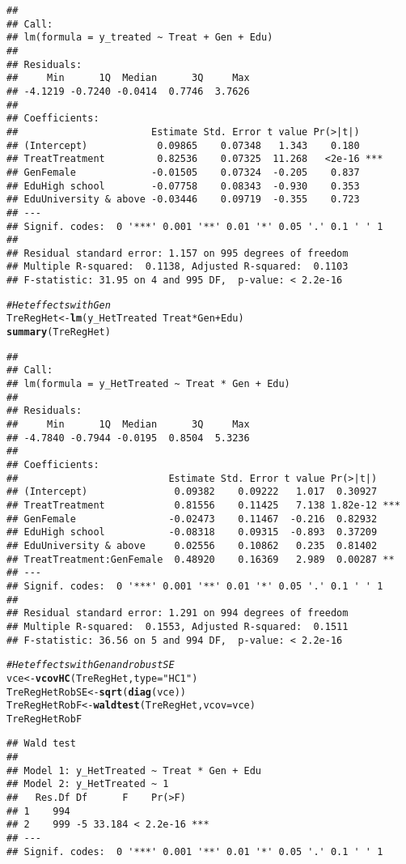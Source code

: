 \documentclass[11pt, a4paper]{article}\usepackage[]{graphicx}\usepackage[]{color}
\makeatletter
\newcommand{\hlstr}[1]{\textcolor[rgb]{0.192,0.494,0.8}{#1}}%
\newcommand{\hlcom}[1]{\textcolor[rgb]{0.678,0.584,0.686}{\textit{#1}}}%
\newcommand{\hlopt}[1]{\textcolor[rgb]{0,0,0}{#1}}%
\newcommand{\hlstd}[1]{\textcolor[rgb]{0.345,0.345,0.345}{#1}}%
\newcommand{\hlkwb}[1]{\textcolor[rgb]{0.69,0.353,0.396}{#1}}%
\newcommand{\hlkwc}[1]{\textcolor[rgb]{0.333,0.667,0.333}{#1}}%
\newcommand{\hlkwd}[1]{\textcolor[rgb]{0.737,0.353,0.396}{\textbf{#1}}}%
\newenvironment{kframe}{%
 \def\at@end@of@kframe{}%
 \ifinner\ifhmode%
  \def\at@end@of@kframe{\end{minipage}}%
  \begin{minipage}{\columnwidth}%
 \fi\fi%
 \def\FrameCommand##1{\hskip\@totalleftmargin \hskip-\fboxsep
 \colorbox{shadecolor}{##1}\hskip-\fboxsep
     \hskip-\linewidth \hskip-\@totalleftmargin \hskip\columnwidth}%
 \MakeFramed {\advance\hsize-\width
   \@totalleftmargin\z@ \linewidth\hsize
   \@setminipage}}%
 {\par\unskip\endMakeFramed%
 \at@end@of@kframe}
\newenvironment{knitrout}{}{} %
\makeatother
\begin{document}
\begin{knitrout}
\begin{kframe}
\begin{alltt}
\end{alltt}
\begin{verbatim}
## 
## Call:
## lm(formula = y_treated ~ Treat + Gen + Edu)
## 
## Residuals:
##     Min      1Q  Median      3Q     Max 
## -4.1219 -0.7240 -0.0414  0.7746  3.7626 
## 
## Coefficients:
##                       Estimate Std. Error t value Pr(>|t|)    
## (Intercept)            0.09865    0.07348   1.343    0.180    
## TreatTreatment         0.82536    0.07325  11.268   <2e-16 ***
## GenFemale             -0.01505    0.07324  -0.205    0.837    
## EduHigh school        -0.07758    0.08343  -0.930    0.353    
## EduUniversity & above -0.03446    0.09719  -0.355    0.723    
## ---
## Signif. codes:  0 '***' 0.001 '**' 0.01 '*' 0.05 '.' 0.1 ' ' 1
## 
## Residual standard error: 1.157 on 995 degrees of freedom
## Multiple R-squared:  0.1138,	Adjusted R-squared:  0.1103 
## F-statistic: 31.95 on 4 and 995 DF,  p-value: < 2.2e-16
\end{verbatim}
\begin{alltt}
  \hlcom{#Het effects with Gen}
  \hlstd{TreRegHet} \hlkwb{<-} \hlkwd{lm}\hlstd{(y_HetTreated} \hlopt{~} \hlstd{Treat}\hlopt{*}\hlstd{Gen} \hlopt{+} \hlstd{Edu)}
  \hlkwd{summary}\hlstd{(TreRegHet)}
\end{alltt}
\begin{verbatim}
## 
## Call:
## lm(formula = y_HetTreated ~ Treat * Gen + Edu)
## 
## Residuals:
##     Min      1Q  Median      3Q     Max 
## -4.7840 -0.7944 -0.0195  0.8504  5.3236 
## 
## Coefficients:
##                          Estimate Std. Error t value Pr(>|t|)    
## (Intercept)               0.09382    0.09222   1.017  0.30927    
## TreatTreatment            0.81556    0.11425   7.138 1.82e-12 ***
## GenFemale                -0.02473    0.11467  -0.216  0.82932    
## EduHigh school           -0.08318    0.09315  -0.893  0.37209    
## EduUniversity & above     0.02556    0.10862   0.235  0.81402    
## TreatTreatment:GenFemale  0.48920    0.16369   2.989  0.00287 ** 
## ---
## Signif. codes:  0 '***' 0.001 '**' 0.01 '*' 0.05 '.' 0.1 ' ' 1
## 
## Residual standard error: 1.291 on 994 degrees of freedom
## Multiple R-squared:  0.1553,	Adjusted R-squared:  0.1511 
## F-statistic: 36.56 on 5 and 994 DF,  p-value: < 2.2e-16
\end{verbatim}
\begin{alltt}
  \hlcom{#Het effects with Gen and robust SE}
  \hlstd{vce} \hlkwb{<-} \hlkwd{vcovHC}\hlstd{(TreRegHet,} \hlkwc{type} \hlstd{=} \hlstr{"HC1"}\hlstd{)}
  \hlstd{TreRegHetRobSE} \hlkwb{<-} \hlkwd{sqrt}\hlstd{(}\hlkwd{diag}\hlstd{(vce))}
  \hlstd{TreRegHetRobF} \hlkwb{<-} \hlkwd{waldtest}\hlstd{(TreRegHet,} \hlkwc{vcov} \hlstd{= vce)}
  \hlstd{TreRegHetRobF}
\end{alltt}
\begin{verbatim}
## Wald test
## 
## Model 1: y_HetTreated ~ Treat * Gen + Edu
## Model 2: y_HetTreated ~ 1
##   Res.Df Df      F    Pr(>F)    
## 1    994                        
## 2    999 -5 33.184 < 2.2e-16 ***
## ---
## Signif. codes:  0 '***' 0.001 '**' 0.01 '*' 0.05 '.' 0.1 ' ' 1
\end{verbatim}
\end{kframe}
\end{knitrout}
\end{document}
